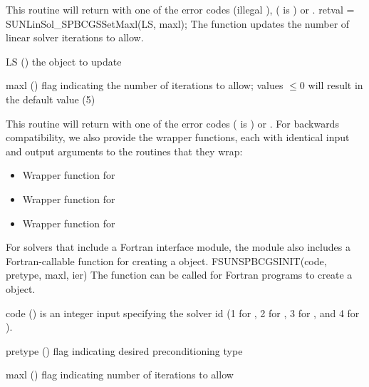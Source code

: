 {
  This routine will return with one of the error codes
   (illegal ), 
  ( is ) or .
}
{
}
{
  retval = SUNLinSol\_SPBCGSSetMaxl(LS, maxl);
}
{
  The function  updates the number of
  linear solver iterations to allow.
}
{
  \begin{args}[maxl]
  \item[LS] ()
    the {\sunlinsolspbcgs} object to update
  \item[maxl] ()
    flag indicating the number of iterations to allow; values $\le0$
    will result in the default value (5)
  \end{args}
}
{
  This routine will return with one of the error codes
   ( is ) or .
}
{
}
For backwards compatibility, we also provide the wrapper functions,
each with identical input and output arguments to the routines that
they wrap:
\begin{itemize}

\item {}

  Wrapper function for 

\item {}

  Wrapper function for 

\item {}

  Wrapper function for 

\end{itemize}
For solvers that include a Fortran interface module, the
{\sunlinsolspbcgs} module also includes a Fortran-callable function
for creating a  object.
{
  FSUNSPBCGSINIT(code, pretype, maxl, ier)
}
{
  The function  can be called for Fortran programs
  to create a {\sunlinsolspbcgs} object.
}
{
  \begin{args}[pretype]
  \item[code] ()
    is an integer input specifying the solver id (1 for {\cvode}, 2
    for {\ida}, 3 for {\kinsol}, and 4 for {\arkode}).
  \item[pretype] ()
    flag indicating desired preconditioning type
  \item[maxl] ()
    flag indicating number of iterations to allow
  \end{args}
}
